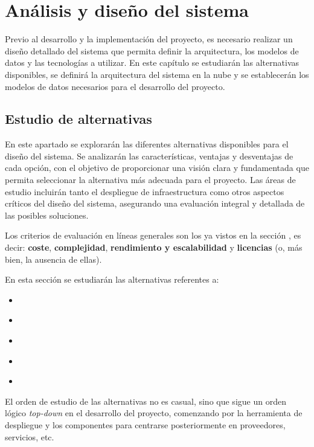 \chapter{Análisis y diseño del sistema}\label{chap:diseño}
Previo al desarrollo y la implementación del proyecto, es necesario realizar un
diseño detallado del sistema que permita definir la arquitectura, los modelos de
datos y las tecnologías a utilizar. En este capítulo se estudiarán las
alternativas disponibles, se definirá la arquitectura del sistema en la nube y
se establecerán los modelos de datos necesarios para el desarrollo del proyecto.


\section{Estudio de alternativas}\label{sec:estudio}
En este apartado se explorarán las diferentes alternativas disponibles para el
diseño del sistema. Se analizarán las características, ventajas y desventajas de
cada opción, con el objetivo de proporcionar una visión clara y fundamentada que
permita seleccionar la alternativa más adecuada para el proyecto. Las áreas de
estudio incluirán tanto el despliegue de infraestructura como otros aspectos
críticos del diseño del sistema, asegurando una evaluación integral y detallada
de las posibles soluciones.

Los criterios de evaluación en líneas generales son los ya vistos en la sección
, es decir: \textbf{coste}, \textbf{complejidad},
\textbf{rendimiento y escalabilidad} y \textbf{licencias} (o, más bien, la
ausencia de ellas).

En esta sección se estudiarán las alternativas referentes a:

\begin{itemize}
	\item \textbf{}
	\item \textbf{}
	\item \textbf{}
	\item \textbf{}
	\item \textbf{}
\end{itemize}

El orden de estudio de las alternativas no es casual, sino que sigue un orden
lógico \textit{top-down} en el desarrollo del proyecto, comenzando por la
herramienta de despliegue y los componentes para centrarse posteriormente en
proveedores, servicios, etc.


